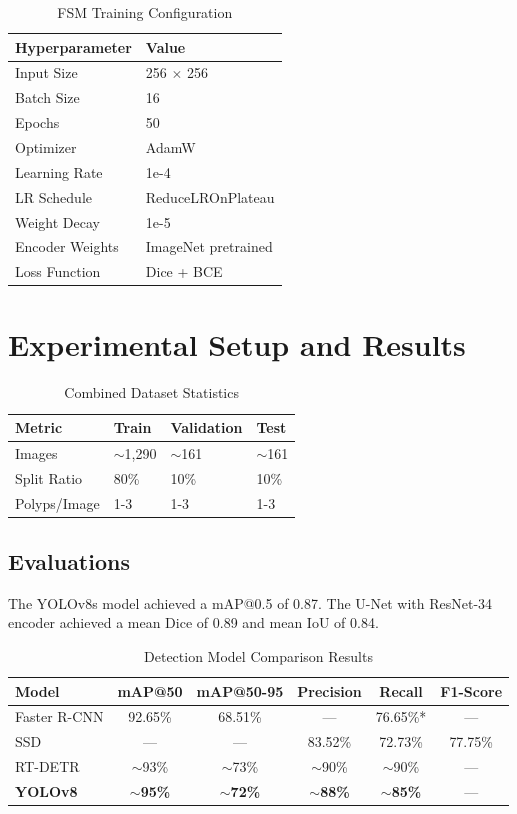 \documentclass[11pt,a4paper]{article}
\begin{document}
\begin{table}[h]
\centering
\caption{FSM Training Configuration}
\begin{tabular}{ll}
\toprule
Hyperparameter & Value \\
\midrule
Input Size & 256 $\times$ 256 \\
Batch Size & 16 \\
Epochs & 50 \\
Optimizer & AdamW \\
Learning Rate & 1e-4 \\
LR Schedule & ReduceLROnPlateau \\
Weight Decay & 1e-5 \\
Encoder Weights & ImageNet pretrained \\
Loss Function & Dice + BCE \\
\bottomrule
\end{tabular}
\end{table}

\section{Experimental Setup and Results}

\begin{table}[h]
\centering
\caption{Combined Dataset Statistics}
\begin{tabular}{llll}
\toprule
Metric & Train & Validation & Test \\
\midrule
Images & $\sim$1,290 & $\sim$161 & $\sim$161 \\
Split Ratio & 80\% & 10\% & 10\% \\
Polyps/Image & 1-3 & 1-3 & 1-3 \\
\bottomrule
\end{tabular}
\end{table}

\subsection{Evaluations}
The YOLOv8s model achieved a mAP@0.5 of 0.87. The U-Net with ResNet-34 encoder achieved a mean Dice of 0.89 and mean IoU of 0.84.

\begin{table}[h]
\centering
\caption{Detection Model Comparison Results}
\begin{tabular}{lccccc}
\toprule
Model & mAP@50 & mAP@50-95 & Precision & Recall & F1-Score \\
\midrule
Faster R-CNN & 92.65\% & 68.51\% & --- & 76.65\%* & --- \\
SSD & --- & --- & 83.52\% & 72.73\% & 77.75\% \\
RT-DETR & $\sim$93\% & $\sim$73\% & $\sim$90\% & $\sim$90\% & --- \\
\textbf{YOLOv8} & \textbf{$\sim$95\%} & \textbf{$\sim$72\%} & \textbf{$\sim$88\%} & \textbf{$\sim$85\%} & --- \\
\bottomrule
\end{tabular}
\end{table}
\end{document}
